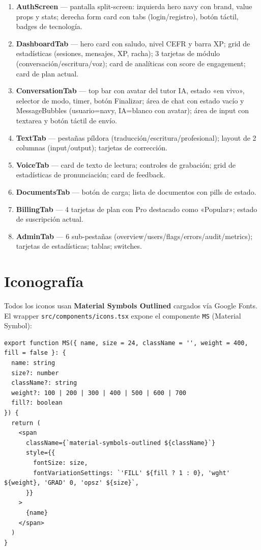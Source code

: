 \documentclass[10pt,a4paper,oneside]{report}
\begin{document}
\begin{enumerate}[leftmargin=1.6em]
\item \textbf{AuthScreen} — pantalla split-screen: izquierda hero navy con brand, value props y stats; derecha form card con tabs (login/registro), botón táctil, badges de tecnología.
\item \textbf{DashboardTab} — hero card con saludo, nivel CEFR y barra XP; grid de estadísticas (sesiones, mensajes, XP, racha); 3 tarjetas de módulo (conversación/escritura/voz); card de analíticas con score de engagement; card de plan actual.
\item \textbf{ConversationTab} — top bar con avatar del tutor IA, estado «en vivo», selector de modo, timer, botón Finalizar; área de chat con estado vacío y MessageBubbles (usuario=navy, IA=blanco con avatar); área de input con textarea y botón táctil de envío.
\item \textbf{TextTab} — pestañas píldora (traducción/escritura/profesional); layout de 2 columnas (input/output); tarjetas de corrección.
\item \textbf{VoiceTab} — card de texto de lectura; controles de grabación; grid de estadísticas de pronunciación; card de feedback.
\item \textbf{DocumentsTab} — botón de carga; lista de documentos con pills de estado.
\item \textbf{BillingTab} — 4 tarjetas de plan con Pro destacado como «Popular»; estado de suscripción actual.
\item \textbf{AdminTab} — 6 sub-pestañas (overview/users/flags/errors/audit/metrics); tarjetas de estadísticas; tablas; switches.
\end{enumerate}

\section{Iconografía}
Todos los iconos usan \textbf{Material Symbols Outlined} cargados vía Google Fonts. El wrapper \texttt{src/components/icons.tsx} expone el componente \texttt{MS} (Material Symbol):

\begin{lstlisting}[style=ts,caption={Wrapper de iconos Material Symbols}]
export function MS({ name, size = 24, className = '', weight = 400, fill = false }: {
  name: string
  size?: number
  className?: string
  weight?: 100 | 200 | 300 | 400 | 500 | 600 | 700
  fill?: boolean
}) {
  return (
    <span
      className={`material-symbols-outlined ${className}`}
      style={{
        fontSize: size,
        fontVariationSettings: `'FILL' ${fill ? 1 : 0}, 'wght' ${weight}, 'GRAD' 0, 'opsz' ${size}`,
      }}
    >
      {name}
    </span>
  )
}
\end{lstlisting}
\end{document}
